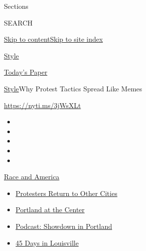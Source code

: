 Sections

SEARCH

\protect\hyperlink{site-content}{Skip to
content}\protect\hyperlink{site-index}{Skip to site index}

\href{https://www.nytimes3xbfgragh.onion/section/style}{Style}

\href{https://myaccount.nytimes3xbfgragh.onion/auth/login?response_type=cookie\&client_id=vi}{}

\href{https://www.nytimes3xbfgragh.onion/section/todayspaper}{Today's
Paper}

\href{/section/style}{Style}\textbar{}Why Protest Tactics Spread Like
Memes

\url{https://nyti.ms/3jWsXLt}

\begin{itemize}
\item
\item
\item
\item
\item
\end{itemize}

\href{https://www.nytimes3xbfgragh.onion/news-event/george-floyd-protests-minneapolis-new-york-los-angeles?action=click\&pgtype=Article\&state=default\&region=TOP_BANNER\&context=storylines_menu}{Race
and America}

\begin{itemize}
\tightlist
\item
  \href{https://www.nytimes3xbfgragh.onion/2020/07/26/us/protests-portland-seattle-trump.html?action=click\&pgtype=Article\&state=default\&region=TOP_BANNER\&context=storylines_menu}{Protesters
  Return to Other Cities}
\item
  \href{https://www.nytimes3xbfgragh.onion/2020/07/24/us/portland-oregon-protests-white-race.html?action=click\&pgtype=Article\&state=default\&region=TOP_BANNER\&context=storylines_menu}{Portland
  at the Center}
\item
  \href{https://www.nytimes3xbfgragh.onion/2020/07/23/podcasts/the-daily/portland-protests.html?action=click\&pgtype=Article\&state=default\&region=TOP_BANNER\&context=storylines_menu}{Podcast:
  Showdown in Portland}
\item
  \href{https://www.nytimes3xbfgragh.onion/interactive/2020/07/16/us/black-lives-matter-protests-louisville-breonna-taylor.html?action=click\&pgtype=Article\&state=default\&region=TOP_BANNER\&context=storylines_menu}{45
  Days in Louisville}
\end{itemize}

